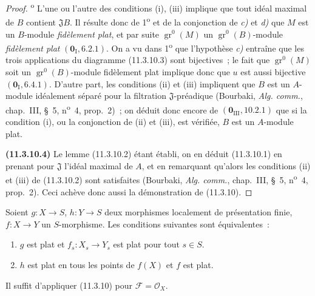 \begin{proof}
\textsuperscript{o} L'une ou l'autre des conditions (i), (iii)
implique que tout idéal maximal de $B$ contient $\mathfrak JB$. Il résulte donc
de 1\textsuperscript{o} et de la conjonction de \emph{c)} et \emph{d)} que $M$ est un
$B$-module \emph{fidèlement plat}, et par suite $\operatorname{gr}^0(M)$ un
$\operatorname{gr}^0(B)$-module \emph{fidèlement plat}
$(\mathbf 0_{\mathrm I},6.2.1)$. On a vu dans 1\textsuperscript{o} que
l'hypothèse \emph{c)} entraîne que les trois applications du diagramme (11.3.10.3)
sont bijectives~; le fait que $\operatorname{gr}^0(M)$ soit un
$\operatorname{gr}^0(B)$-module fidèlement plat implique donc que $u$ est aussi
bijective $(\mathbf 0_{\mathrm I},6.4.1)$. D'autre part, les conditions (ii) et
(iii) impliquent que $B$ est un $A$-module idéalement séparé pour la filtration
$\mathfrak J$-préadique (Bourbaki, \emph{Alg. comm.}, chap.~III, \S~5,
n\textsuperscript{o}~4, prop.~2)~; on déduit donc encore de
$(\mathbf 0_{\mathrm{III}},10.2.1)$ que si la condition (i), ou la conjonction
de (ii) et (iii), est vérifiée, $B$ est un $A$-module plat.

\label{IV.11.3.10.4-fr}
\noindent\textbf{(11.3.10.4)} Le lemme (11.3.10.2) étant établi, on en déduit
(11.3.10.1) en prenant pour $\mathfrak J$ l'idéal maximal de $A$, et en
remarquant qu'alors les conditions (ii) et (iii) de (11.3.10.2) sont
satisfaites (Bourbaki, \emph{Alg. comm.}, chap.~III, \S~5, n\textsuperscript{o}~4,
prop.~2). Ceci achève donc aussi la démonstration de (11.3.10).
\end{proof}

\begin{corollary}[11.3.11]
\label{IV.11.3.11-fr}
Soient $g:X\to S$, $h:Y\to S$ deux morphismes localement de présentation
finie, $f:X\to Y$ un $S$-morphisme. Les conditions suivantes sont
équivalentes~:
\begin{enumerate}[label=\emph{\alph*)}]
\item $g$ est plat et $f_s:X_s\to Y_s$ est plat pour tout $s\in S$.
\item $h$ est plat en tous les points de $f(X)$ et $f$ est plat.
\end{enumerate}
\end{corollary}

Il suffit d'appliquer (11.3.10) pour $\mathcal F=\mathcal O_X$.

